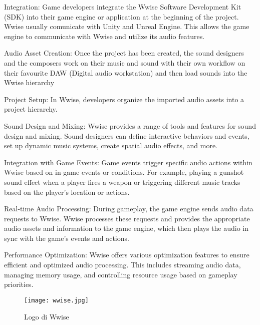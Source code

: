 \begin{compactitem}
	\item Integration: Game developers integrate the Wwise Software Development Kit (SDK) into their game engine or application at the beginning of the project. Wwise usually comunicate with Unity and Unreal Engine. This allows the game engine to communicate with Wwise and utilize its audio features.
		
	\item Audio Asset Creation: Once the project has been created, the sound designers and the composers work on their music and sound with their own workflow on their favourite DAW (Digital audio workstation) and then load sounds into the Wwise hierarchy
		
	\item Project Setup: In Wwise, developers organize the imported audio assets into a project hierarchy.
		
	\item Sound Design and Mixing: Wwise provides a range of tools and features for sound design and mixing. Sound designers can define interactive behaviors and events, set up dynamic music systems, create spatial audio effects, and more.
		
	\item Integration with Game Events: Game events trigger specific audio actions within Wwise based on in-game events or conditions. For example, playing a gunshot sound effect when a player fires a weapon or triggering different music tracks based on the player's location or actions.
		
	\item Real-time Audio Processing: During gameplay, the game engine sends audio data requests to Wwise. Wwise processes these requests and provides the appropriate audio assets and information to the game engine, which then plays the audio in sync with the game's events and actions.
		
	\item Performance Optimization: Wwise offers various optimization features to ensure efficient and optimized audio processing. This includes streaming audio data, managing memory usage, and controlling resource usage based on gameplay priorities.
\end{compactitem}

\begin{figure}
	\begin{center}
		\texttt{[image: wwise.jpg]}
		\caption{Logo di Wwise}
	\end{center}
\end{figure}

